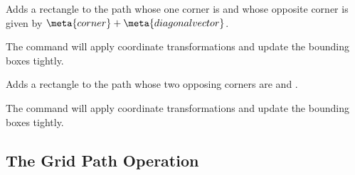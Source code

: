 \begin{command}{\pgfpathrectangle{}}
  Adds a rectangle to the path whose one corner is  and
  whose opposite corner is given by $\meta{corner} + \meta{diagonal
    vector}$.

\begin{codeexample}[]
\end{codeexample}
  The command will apply coordinate transformations and update the
  bounding boxes tightly.
\end{command}


\begin{command}{\pgfpathrectanglecorners{}}
  Adds a rectangle to the path whose two opposing corners are
   and .
\begin{codeexample}[]
\end{codeexample}
  The command will apply coordinate transformations and update the
  bounding boxes tightly.
\end{command}



\subsection{The Grid Path Operation}

